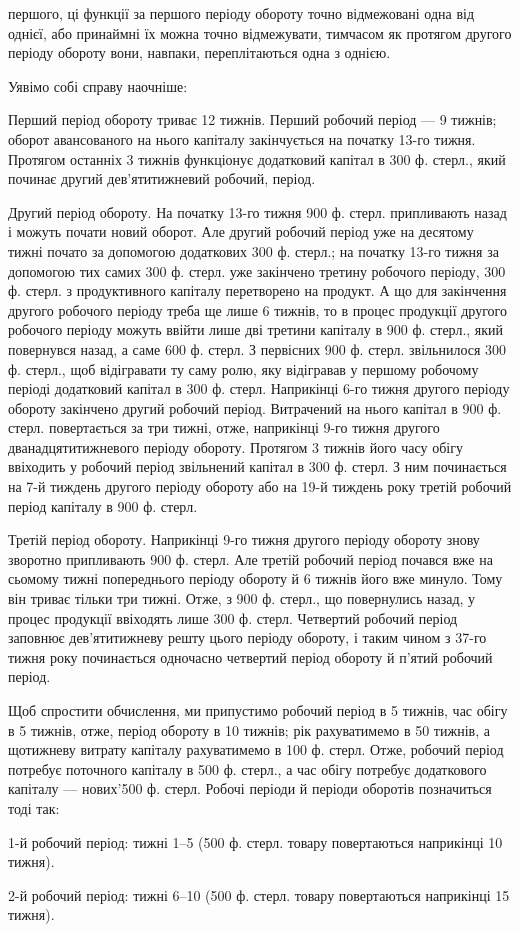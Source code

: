 \parcont{}  %
першого, ці функції за першого періоду обороту точно відмежовані одна
від однієї, або принаймні їх можна точно відмежувати, тимчасом як протягом
другого періоду обороту вони, навпаки, переплітаються одна з
однією.

Уявімо собі справу наочніше:

Перший період обороту триває 12 тижнів. Перший робочий період —
9 тижнів; оборот авансованого на нього капіталу закінчується на початку
13-го тижня. Протягом останніх 3 тижнів функціонує додатковий капітал
в 300 ф. стерл., який починає другий дев’ятитижневий робочий,
період.

Другий період обороту. На початку 13-го тижня 900 ф. стерл. припливають
назад і можуть почати новий оборот. Але другий робочий
період уже на десятому тижні почато за допомогою додаткових 300 ф.
стерл.; на початку 13-го тижня за допомогою тих самих 300 ф. стерл.
уже закінчено третину робочого періоду, 300 ф. стерл. з продуктивного
капіталу перетворено на продукт. А що для закінчення другого робочого
періоду треба ще лише 6 тижнів, то в процес продукції другого робочого
періоду можуть ввійти лише дві третини капіталу в 900 ф. стерл.,
який повернувся назад, а саме 600 ф. стерл. З первісних 900 ф. стерл.
звільнилося 300 ф. стерл., щоб відігравати ту саму ролю, яку відігравав
у першому робочому періоді додатковий капітал в 300 ф. стерл. Наприкінці
6-го тижня другого періоду обороту закінчено другий робочий
період. Витрачений на нього капітал в 900 ф. стерл. повертається за три
тижні, отже, наприкінці 9-го тижня другого дванадцятитижневого періоду
обороту. Протягом 3 тижнів його часу обігу ввіходить у робочий період
звільнений капітал в 300 ф. стерл. З ним починається на 7-й тиждень
другого періоду обороту або на 19-й тиждень року третій робочий
період капіталу в 900 ф. стерл.

Третій період обороту. Наприкінці 9-го тижня другого періоду обороту
знову зворотно припливають 900 ф. стерл. Але третій робочий
період почався вже на сьомому тижні попереднього періоду обороту й
6 тижнів його вже минуло. Тому він триває тільки три тижні. Отже,
з 900 ф. стерл., що повернулись назад, у процес продукції ввіходять
лише 300 ф. стерл. Четвертий робочий період заповнює дев’ятитижневу
решту цього періоду обороту, і таким чином з 37-го тижня року починається
одночасно четвертий період обороту й п’ятий робочий період.

Щоб спростити обчислення, ми припустимо робочий період в 5 тижнів,
час обігу в 5 тижнів, отже, період обороту в 10 тижнів; рік рахуватимемо
в 50 тижнів, а щотижневу витрату капіталу рахуватимемо в 100 ф.
стерл. Отже, робочий період потребує поточного капіталу в 500 ф. стерл.,
а час обігу потребує додаткового капіталу — нових'500 ф. стерл. Робочі
періоди й періоди оборотів позначиться тоді так:

1-й робочий період: тижні 1--5 (500 ф. стерл. товару повертаються
наприкінці 10 тижня).

2-й робочий період: тижні 6--10 (500 ф. стерл. товару повертаються
наприкінці 15 тижня).
